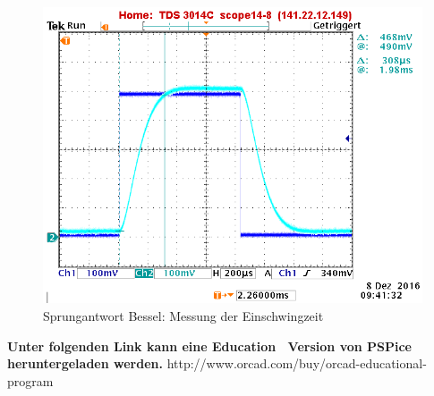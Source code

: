\begin{figure}[h]
\centering
\includegraphics[width=0.60\linewidth]{Bilder/ImLabor/Sprungantwort_5_2_Bessel_Einschwingzeit}
\caption{Sprungantwort Bessel: Messung der Einschwingzeit}
\label{fig:Sprungantwort_5_2_Bessel_Einschwingzeit}
\end{figure}












\noindent \textbf{Unter folgenden Link kann eine \glqq Education\grqq~ Version von PSPice heruntergeladen werden.}
http://www.orcad.com/buy/orcad-educational-program


